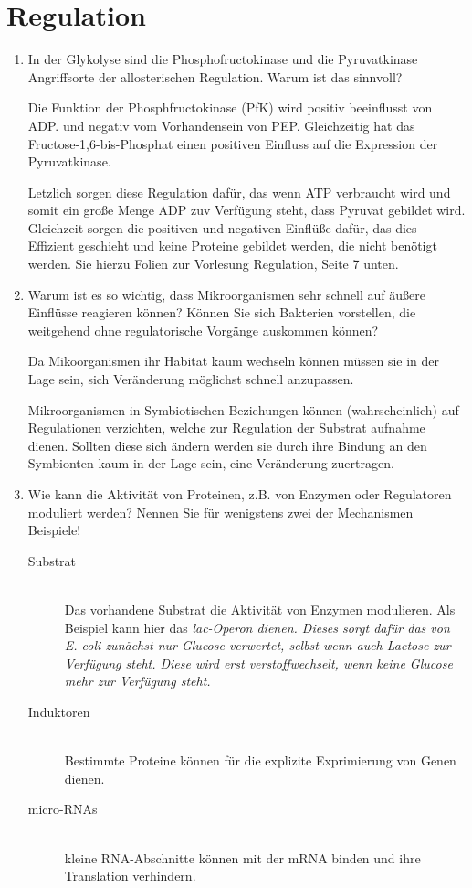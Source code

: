 
\section{Regulation}
\begin{enumerate}
	\item In der Glykolyse sind die Phosphofructokinase und die Pyruvatkinase Angriffsorte der allosterischen Regulation. Warum ist das sinnvoll?

		Die Funktion der Phosphfructokinase (PfK) wird positiv beeinflusst von ADP.
		und negativ vom Vorhandensein von PEP.	%
		Gleichzeitig hat das Fructose-1,6-bis-Phosphat einen positiven Einfluss auf die Expression
		der Pyruvatkinase.

		Letzlich sorgen diese Regulation dafür,
		das wenn ATP verbraucht wird und somit ein große Menge ADP zuv Verfügung steht,
		dass Pyruvat gebildet wird.
		Gleichzeit sorgen die positiven und negativen Einflüße dafür,
		das dies Effizient geschieht und keine Proteine gebildet werden,
		die nicht benötigt werden.
		Sie hierzu Folien zur Vorlesung Regulation, Seite 7 unten. %

	\item Warum ist es so wichtig, dass Mikroorganismen sehr schnell auf äußere Einflüsse reagieren können? Können Sie sich Bakterien vorstellen, die weitgehend ohne regulatorische Vorgänge auskommen können?

		Da Mikoorganismen ihr Habitat kaum wechseln können müssen sie in der Lage sein,
		sich Veränderung möglichst schnell anzupassen.

		Mikroorganismen in Symbiotischen Beziehungen können (wahrscheinlich) auf Regulationen verzichten,
		welche zur Regulation der Substrat aufnahme dienen.
		Sollten diese sich ändern werden sie durch ihre Bindung an den Symbionten kaum in der Lage sein,
		eine Veränderung zuertragen.

	\item Wie kann die Aktivität von Proteinen, z.B. von Enzymen oder Regulatoren moduliert werden? Nennen Sie für wenigstens zwei der Mechanismen Beispiele!

		\begin{description}
			\item[Substrat] \hfill \\
				Das vorhandene Substrat die Aktivität von Enzymen modulieren.
				Als Beispiel kann hier das \slshape{lac}-Operon dienen.
				Dieses sorgt dafür das von \emph{E. coli} zunächst nur Glucose verwertet,
				selbst wenn auch Lactose zur Verfügung steht.
				Diese wird erst verstoffwechselt,
				wenn keine Glucose mehr zur Verfügung steht.
			\item[Induktoren] \hfill \\
				Bestimmte Proteine können für die explizite Exprimierung von Genen dienen. %
			\item[micro-RNAs] \hfill \\
				kleine RNA-Abschnitte können mit der mRNA binden und ihre Translation verhindern.
		\end{description}


\end{enumerate}
